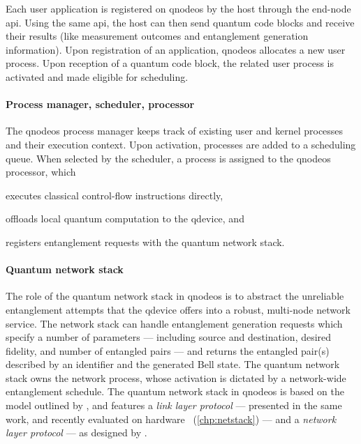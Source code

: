 Each user application is registered on \acrshort{qnodeos} by the host through the end-node
\acrshort{api}. Using the same \acrshort{api}, the host can then send quantum code blocks and
receive their results (like measurement outcomes and entanglement generation information). Upon
registration of an application, \acrshort{qnodeos} allocates a new user process. Upon reception of a
quantum code block, the related user process is activated and made eligible for scheduling.

\paragraph{Process manager, scheduler, processor}

The \acrshort{qnodeos} process manager keeps track of existing user and kernel processes and their
execution context. Upon activation, processes are added to a scheduling queue. When selected by the
scheduler, a process is assigned to the \acrshort{qnodeos} processor, which
%
\begin{inlinelist}
    \item executes classical control-flow instructions directly,
    \item offloads local quantum computation to the \acrshort{qdevice}, and
    \item registers entanglement requests with the quantum network stack.
\end{inlinelist}

\paragraph{Quantum network stack}

The role of the quantum network stack in \acrshort{qnodeos} is to abstract the unreliable
entanglement attempts that the \acrshort{qdevice} offers into a robust, multi-node network service.
The network stack can handle entanglement generation requests which specify a number of parameters
--- including source and destination, desired fidelity, and number of entangled pairs --- and
returns the entangled pair(s) described by an identifier and the generated Bell state. The quantum
network stack owns the network process, whose activation is dictated by a network-wide entanglement
schedule. The quantum network stack in \acrshort{qnodeos} is based on the model outlined by
\textcite{dahlberg_2019_egp}, and features a \emph{link layer protocol} --- presented in the same
work, and recently evaluated on hardware~\cite{pompili_2022_experimental} (\cref{chp:netstack}) ---
and a \emph{network layer protocol} --- as designed by \textcite{kozlowski_2020_qnp}.

